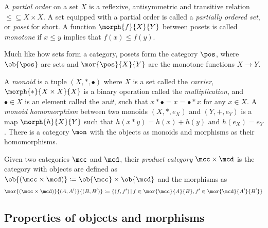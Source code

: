 \begin{example}[Posets]
    A \emph{partial order} on a set \(X\) is a reflexive, antisymmetric and
    transitive relation \(\leq \subseteq X \times X\).
    A set equipped with a partial order is called a
    \emph{partially ordered set}, or \emph{poset} for short.
    A function \(\morph{f}{X}{Y}\) between posets is called \emph{monotone} if
    \(x \leq y\) implies that \(f(x) \leq f(y)\).

    Much like how sets form a category, posets form the category \(\pos\), where
    \(\ob{\pos}\) are sets and \(\mor{\pos}{X}{Y}\) are the monotone functions
    \(X \to Y\).
\end{example}

\begin{example}[Monoids]
    A \emph{monoid} is a tuple \((X, *, \bullet)\) where \(X\) is a set called
    the \emph{carrier}, \(\morph{*}{X \times X}{X}\) is a binary operation
    called the \emph{multiplication}, and \(\bullet \in X\) is an element called
    the \emph{unit}, such that \(x * \bullet = x = \bullet * x\) for any
    \(x \in X\).
    A \emph{monoid homomorphism} between two monoids \((X, *, e_X)\) and
    \((Y, +, e_Y)\) is a map \(\morph{h}{X}{Y}\) such that
    \(h(x * y) = h(x) + h(y)\) and \(h(e_X) = e_Y\).
    There is a category \(\mon\) with the objects as monoids and morphisms as
    their homomorphisms.
\end{example}

\begin{example}
    Given two categories \(\mcc\) and \(\mcd\), their \emph{product category}
    \(\mcc \times \mcd\) is the category with objects are defined as \(
        \ob{(\mcc \times \mcd)} \coloneqq \ob{\mcc} \times \ob{\mcd}
    \) and the morphisms as \[
        \mor{(\mcc \times \mcd)}{(A, A^\prime)}{(B, B^\prime)}
        \coloneqq
        \{
            (f, f^\prime)
            \,|\,
            f \in \mor{\mcc}{A}{B},
            f^\prime \in \mor{\mcd}{A^\prime}{B^\prime}
        \}
    \]
\end{example}

\begin{example}

\end{example}

\subsection{Properties of objects and morphisms}

